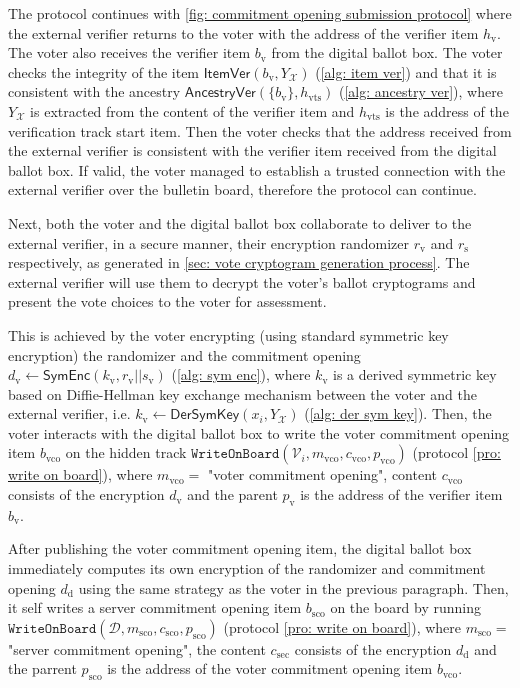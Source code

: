The protocol continues with \cref{fig: commitment opening submission protocol} where the external verifier returns to the voter with the address of the verifier item $h_\mathrm{v}$. The voter also receives the verifier item $b_\mathrm{v}$ from the digital ballot box. The voter checks the integrity of the item $\mathsf{ItemVer}(b_\mathrm{v}, Y_\mathcal{X})$ (\cref{alg: item ver}) and that it is consistent with the ancestry $\mathsf{AncestryVer}(\{ b_\mathrm{v} \}, h_\mathrm{vts})$ (\cref{alg: ancestry ver}), where $Y_\mathcal{X}$ is extracted from the content of the verifier item and $h_\mathrm{vts}$ is the address of the verification track start item. Then the voter checks that the address received from the external verifier is consistent with the verifier item received from the digital ballot box. If valid, the voter managed to establish a trusted connection with the external verifier over the bulletin board, therefore the protocol can continue.

Next, both the voter and the digital ballot box collaborate to deliver to the external verifier, in a secure manner, their encryption randomizer $r_\mathrm{v}$ and $r_\mathrm{s}$ respectively, as generated in \cref{sec: vote cryptogram generation process}. The external verifier will use them to decrypt the voter's ballot cryptograms and present the vote choices to the voter for assessment.

This is achieved by the voter encrypting (using standard symmetric key encryption) the randomizer and the commitment opening $d_\mathrm{v} \gets \mathsf{SymEnc}(k_\mathrm{v}, r_\mathrm{v} || s_\mathrm{v})$ (\cref{alg: sym enc}), where $k_\mathrm{v}$ is a derived symmetric key based on Diffie-Hellman key exchange mechanism between the voter and the external verifier, i.e. $k_\mathrm{v} \gets \mathsf{DerSymKey}(x_i, Y_\mathcal{X})$ (\cref{alg: der sym key}). Then, the voter interacts with the digital ballot box to write the voter commitment opening item $b_\mathrm{vco}$ on the hidden track $\mathtt{WriteOnBoard}(\mathcal{V}_i, m_\mathrm{vco}, c_\mathrm{vco}, p_\mathrm{vco})$ (protocol \ref{pro: write on board}), where $m_\mathrm{vco} = $ "voter commitment opening", content $c_\mathrm{vco}$ consists of the encryption $d_\mathrm{v}$ and the parent $p_\mathrm{v}$ is the address of the verifier item $b_\mathrm{v}$.

After publishing the voter commitment opening item, the digital ballot box immediately computes its own encryption of the randomizer and commitment opening $d_\mathrm{d}$ using the same strategy as the voter in the previous paragraph. Then, it self writes a server commitment opening item $b_\mathrm{sco}$ on the board by running $\mathtt{WriteOnBoard}(\mathcal{D}, m_\mathrm{sco}, c_\mathrm{sco}, p_\mathrm{sco})$ (protocol \ref{pro: write on board}), where $m_\mathrm{sco} =$ "server commitment opening", the content $c_\mathrm{sec}$ consists of the encryption $d_\mathrm{d}$ and the parrent $p_\mathrm{sco}$ is the address of the voter commitment opening item $b_\mathrm{vco}$. 

